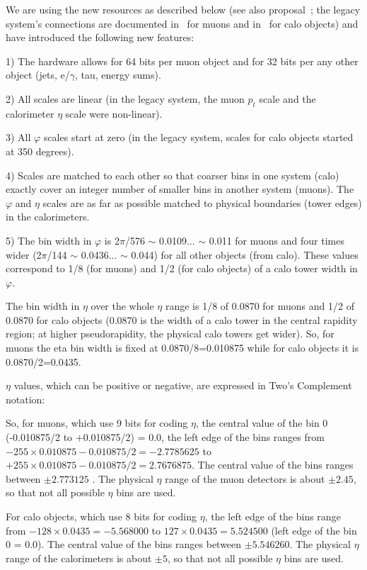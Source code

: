 \documentclass{cmspaper}
\begin{document}
We are using the new resources as described below (see also proposal~\cite{Darin}; the legacy system's connections are documented in~\cite{muon} for muons and in~\cite{calo} for calo objects) and have introduced the following new features:

1) The hardware  allows for 64 bits per muon object and for 32 bits per any other object (jets, e/$\gamma$, tau, energy sums). 

2) All scales are linear (in the legacy system, the muon $p_t$ scale and the calorimeter $\eta$ scale were non-linear).

3) All $\varphi$ scales start at zero (in the legacy system, scales for calo objects started at 350 degrees).

4) Scales are matched to each other so that coarser bins in one system (calo) exactly cover an integer number of smaller bins in another system (muons). The $\varphi$ and $\eta$ scales are as far as possible matched to physical boundaries (tower edges) in the calorimeters.

5) The bin width in  $\varphi$  is 2$\pi$/576 $\sim$ 0.0109... $\sim$ 0.011 for muons and four times wider (2$\pi$/144 $\sim$ 0.0436... $\sim$ 0.044) for all other objects (from calo). These values correspond to 1/8 (for muons) and 1/2 (for calo objects) of a calo tower width in $\varphi$.

The bin width in $\eta$ over the whole $\eta$ range is 1/8 of 0.0870 for muons and 1/2 of 0.0870 for calo objects (0.0870 is the width of a calo tower  in the central rapidity region; at higher pseudorapidity, the physical calo towers get wider). So, for muons the eta bin width is fixed at 0.0870/8=0.010875 while for calo objects it is 0.0870/2=0.0435.

$\eta$ values, which can be positive or negative, are expressed in Two's Complement notation:

So, for muons, which use 9 bits for coding $\eta$, the central value of the bin 0 (-0.010875/2 to +0.010875/2) = 0.0, the left edge of the bins ranges from $-255 \times 0.010875 - 0.010875/2 = -2.7785625$ to $+255 \times 0.010875 - 0.010875/2 = 2.7676875$. The central value of the bins ranges between $\pm 2.773125$ .  The physical $\eta$ range of the muon detectors is about $\pm2.45$, so that not all possible $\eta$ bins are used. 

For calo objects, which use 8 bits for coding $\eta$, the left edge of the bins range from $-128 \times 0.0435 = -5.568000$ to $127 \times 0.0435 = 5.524500$ (left edge of the bin 0 = 0.0). The central value of the bins ranges between $\pm 5.546260$. The physical $\eta$ range of the calorimeters is about $\pm5$, so that not all possible $\eta$ bins are used. 
\end{document}
